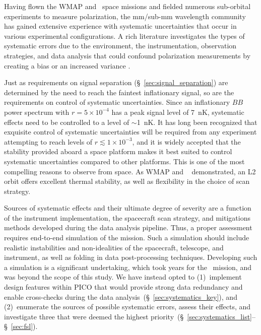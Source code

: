 \documentclass[PICOReport.tex]{subfiles}
\begin{document}
Having flown the WMAP and \planck\ space missions and fielded numerous sub-orbital experiments to measure polarization, the mm/sub-mm wavelength community has gained extensive experience with systematic uncertainties that occur in various experimental configurations. A rich literature investigates the types of systematic errors due to the environment, the instrumentation, observation strategies, and data analysis that could confound polarization measurements by creating a bias or an increased variance \cite{hu03,shimon2008,yadav2010,Griffiths2014,LFI_systematics,Kaplan2002,Miller2009,Pagano2009,SO_sys_optical,SO_sys_detector, bicep_systematics,SPIDER_systematics}.%

Just as requirements on signal separation (\S~\ref{sec:signal_separation}) are determined by the need to reach the faintest inflationary signal, so are the requirements on control of systematic uncertainties. Since an inflationary $BB$ power spectrum with $r = 5 \times 10^{-4}$ has a peak signal level of 7~nK, systematic effects need to be controlled to a level of $\sim$1~nK. It has long been recognized that exquisite control of systematic uncertainties will be required from any experiment attempting to reach levels of $r \lesssim 1\times 10^{-3}$, and it is widely accepted that the stability provided aboard a space platform makes it best suited to control systematic uncertainties compared to other platforms. This is one of the most compelling reasons to observe from space.  As WMAP and \planck~ demonstrated, an L2 orbit offers excellent thermal stability, as well as flexibility in the choice of scan strategy.  

Sources of systematic effects and their ultimate degree of severity are a function of the instrument implementation, the spacecraft scan strategy, and mitigations methods developed during the data analysis pipeline. Thus, a proper assessment requires end-to-end simulation of the mission. Such a simulation should include realistic instabilities and non-idealities of the spacecraft, telescope, and instrument, as well as folding in data post-processing techniques. Developing such a simulation is a significant undertaking, which took years  for the \planck\ mission, and was beyond the scope of this study. We have instead opted to (1)~implement design features within PICO that would provide strong data redundancy and enable cross-checks during the data analysis~(\S~\ref{sec:systematics_key}), and (2)~enumerate the sources of possible systematic errors, assess their effects, and investigate three that were deemed the highest priority~(\S~\ref{sec:systematics_list}--\S~\ref{sec:fsl}). 
\end{document}
